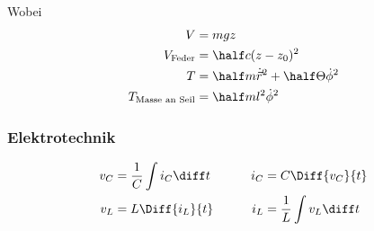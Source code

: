 		Wobei
		\begin{align*}
			V &= mgz \\
			V_\text{Feder} &= \half c (z - z_0)^2 \\
			T &= \half m \dot{\vec r}^2 + \half \Theta \dot \phi^2 \\
			T_\text{Masse an Seil} &= \half m l^2 \dot \phi^2
		\end{align*}

	\subsubsection{Elektrotechnik} %
		\begin{alignat*}{2}
			v_C &= \frac{1}{C} \int i_C \diff t & \qquad
			i_C &= C \Diff{v_C}{t} \\
			v_L &= L \Diff{i_L}{t} &
			i_L &= \frac{1}{L} \int v_L \diff t
		\end{alignat*}
	
